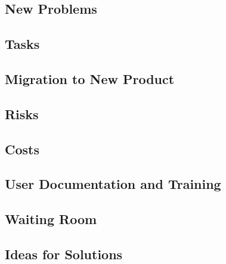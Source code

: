 \documentclass[12pt]{article}
\begin{document}
\subsection{New Problems}
\subsection{Tasks}
\subsection{Migration to New Product}
\subsection{Risks}
\subsection{Costs}
\subsection{User Documentation and Training}
\subsection{Waiting Room}
\subsection{Ideas for Solutions}
\end{document}
